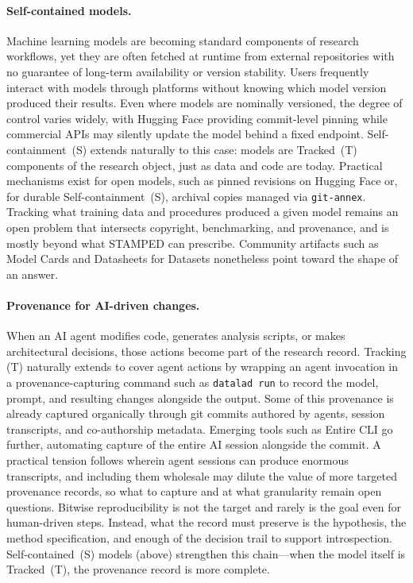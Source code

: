 \documentclass{article}
\begin{document}
\paragraph{Self-contained models.}
Machine learning models are becoming standard components of research workflows, yet they are often fetched at runtime from external repositories with no guarantee of long-term availability or version stability.
Users frequently interact with models through platforms without knowing which model version produced their results.
Even where models are nominally versioned, the degree of control varies widely, with Hugging Face providing commit-level pinning while commercial APIs may silently update the model behind a fixed endpoint.
Self-containment~(S) extends naturally to this case: models are Tracked~(T) components of the research object, just as data and code are today.
Practical mechanisms exist for open models, such as pinned revisions on Hugging Face or, for durable Self-containment~(S), archival copies managed via \texttt{git-annex}.
Tracking what training data and procedures produced a given model remains an open problem that intersects copyright, benchmarking, and provenance, and is mostly beyond what STAMPED can prescribe.
Community artifacts such as Model Cards\cite{mitchell_model_2019} and Datasheets for Datasets\cite{gebru_datasheets_2021} nonetheless point toward the shape of an answer.

\paragraph{Provenance for AI-driven changes.}
When an AI agent modifies code, generates analysis scripts, or makes architectural decisions, those actions become part of the research record.
Tracking (T) naturally extends to cover agent actions by wrapping an agent invocation in a provenance-capturing command such as \texttt{datalad run} to record the model, prompt, and resulting changes alongside the output.
Some of this provenance is already captured organically through git commits authored by agents, session transcripts, and co-authorship metadata.
Emerging tools such as Entire CLI\cite{entire_entire_2026} go further, automating capture of the entire AI session alongside the commit.
A practical tension follows wherein agent sessions can produce enormous transcripts, and including them wholesale may dilute the value of more targeted provenance records, so what to capture and at what granularity remain open questions.
Bitwise reproducibility is not the target and rarely is the goal even for human-driven steps.
Instead, what the record must preserve is the hypothesis, the method specification, and enough of the decision trail to support introspection.
Self-contained~(S) models (above) strengthen this chain---when the model itself is Tracked~(T), the provenance record is more complete.
\end{document}
